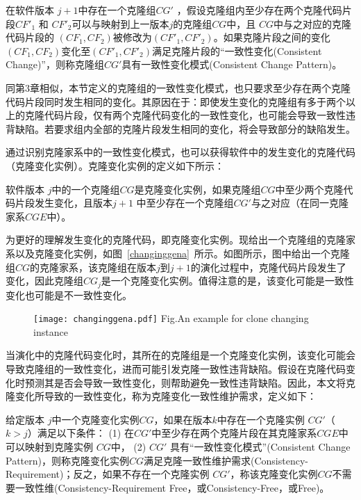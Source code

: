 \begin{definition}[克隆变化一致性模式] 
\label{def-changingpattern}
在软件版本 $j+1$中存在一个克隆组$CG'$ ，假设克隆组内至少存在两个克隆代码片段$CF'_1$ 和 $CF'_2$可以与映射到上一版本$j$的克隆组$CG$中，且 $CG$中与之对应的克隆代码片段的 $(CF_1,CF_2)$被修改为$(CF'_1,CF'_2)$。如果克隆片段之间的变化$(CF_1,CF_2)$变化至$(CF'_1,CF'_2)$满足克隆片段的“一致性变化(Consistent Change)”，则称克隆组$CG'$具有一致性变化模式(Consistent Change Pattern)。
\end{definition}

同第3章相似，本节定义的克隆组的一致性变化模式，也只要求至少存在两个克隆代码片段同时发生相同的变化。其原因在于：即使发生变化的克隆组有多于两个以上的克隆代码片段，仅有两个克隆代码变化的一致性变化，也可能会导致一致性违背缺陷。若要求组内全部的克隆片段发生相同的变化，将会导致部分的缺陷发生。

通过识别克隆家系中的一致性变化模式，也可以获得软件中的发生变化的克隆代码（克隆变化实例）。克隆变化实例的定义如下所示：

\begin{definition}[克隆变化实例] 
\label{def-changinginstance}
软件版本 $j$中的一个克隆组$CG$是克隆变化实例，如果克隆组$CG$中至少两个克隆代码片段发生变化，且版本$j+1$ 中至少存在一个克隆组$CG'$与之对应（在同一克隆家系$CGE$中）。 
\end{definition}

为更好的理解发生变化的克隆代码，即克隆变化实例。现给出一个克隆组的克隆家系以及克隆变化实例，如图~\ref{changinggena}~所示。如图所示，图中给出一个克隆组$CG$的克隆家系，该克隆组在版本$j$到$j+1$的演化过程中，克隆代码片段发生了变化，因此克隆组$CG_j$是一个克隆变化实例。值得注意的是，该变化可能是一致性变化也可能是不一致性变化。

\begin{figure}[htbp]
\centering
\texttt{[image: changinggena.pdf]}
{Fig.$\!$}{An example for clone changing instance}
\vspace{-1em}
\end{figure}

当演化中的克隆代码变化时，其所在的克隆组是一个克隆变化实例，该变化可能会导致克隆组的一致性变化，进而可能引发克隆一致性违背缺陷。假设在克隆代码变化时预测其是否会导致一致性变化，则帮助避免一致性违背缺陷。因此，本文将克隆变化所导致的一致性变化，称为克隆变化一致性维护需求，定义如下：

\begin{definition}[克隆变化一致性维护需求] 
 \label{def-changingrequirement}
给定版本 $j$中一个克隆变化实例$CG$，如果在版本$k$中存在一个克隆实例 $CG'$（$k>j$）满足以下条件： (1) 在$CG'$中至少存在两个克隆片段在其克隆家系$CGE$中可以映射到克隆实例 $CG$中， (2) $CG'$ 具有“一致性变化模式”(Consistent Change Pattern)，则称克隆变化实例$CG$满足克隆一致性维护需求(Consistency-Requirement)；反之，如果不存在一个克隆实例 $CG'$，称该克隆变化实例$CG$不需要一致性维(Consistency-Requirement Free，或Consistency-Free，或Free)。
\end{definition}

